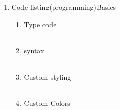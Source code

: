 \begin{enumerate}
     \item Code listing(programming)Basics \\
     \begin{enumerate}
          \item Type code \\
               \begin{myTableStyle} \begin{tabular}{ |m{15cm}| } \hline
                     \\ \hline
               \end{tabular} \end{myTableStyle}

          \item syntax \\
               \begin{myTableStyle} \begin{tabular}{ |m{15cm}| } \hline
                     \\ \hline
               \end{tabular} \end{myTableStyle}

          \item Custom styling \\
               \begin{myTableStyle} \begin{tabular}{ |m{15cm}| } \hline
                     \\ \hline
               \end{tabular} \end{myTableStyle}

          \item Custom Colors \\
               \begin{myTableStyle} \begin{tabular}{ |m{15cm}| } \hline
                     \\ \hline
               \end{tabular} \end{myTableStyle}
     \end{enumerate}


\end{enumerate}
